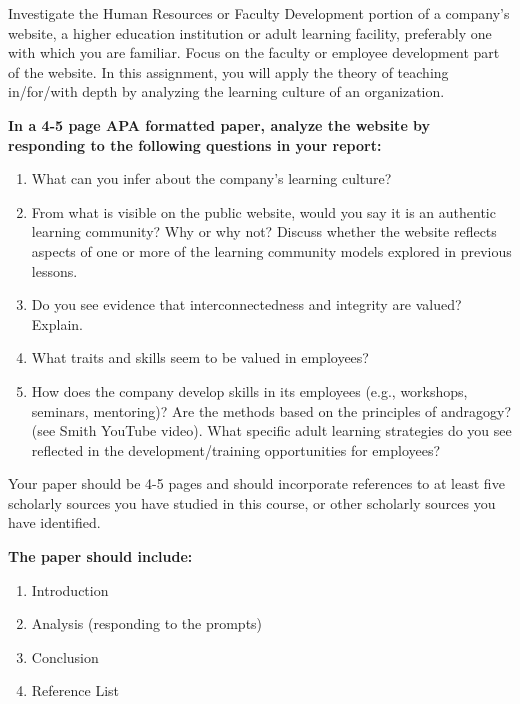 \documentclass[
]{book}
\providecommand{\tightlist}{%
  \setlength{\itemsep}{0pt}\setlength{\parskip}{0pt}}
\begin{document}
\begin{assessment}
Investigate the Human Resources or Faculty Development portion of a
company's website, a higher education institution or adult learning
facility, preferably one with which you are familiar. Focus on the
faculty or employee development part of the website. In this assignment,
you will apply the theory of teaching in/for/with depth by analyzing the
learning culture of an organization.

\textbf{In a 4-5 page APA formatted paper, analyze the website by
responding to the following questions in your report:}

\begin{enumerate}
\def\labelenumi{\arabic{enumi}.}
\tightlist
\item
  What can you infer about the company's learning culture?\\
\item
  From what is visible on the public website, would you say it is an
  authentic learning community? Why or why not? Discuss whether the
  website reflects aspects of one or more of the learning community
  models explored in previous lessons.\\
\item
  Do you see evidence that interconnectedness and integrity are valued?
  Explain.\\
\item
  What traits and skills seem to be valued in employees?\\
\item
  How does the company develop skills in its employees (e.g., workshops,
  seminars, mentoring)? Are the methods based on the principles of
  andragogy? (see Smith YouTube video). What specific adult learning
  strategies do you see reflected in the development/training
  opportunities for employees?
\end{enumerate}

Your paper should be 4-5 pages and should incorporate references to at
least five scholarly sources you have studied in this course, or other
scholarly sources you have identified.

\textbf{The paper should include:}

\begin{enumerate}
\def\labelenumi{\arabic{enumi}.}
\tightlist
\item
  Introduction\\
\item
  Analysis (responding to the prompts)\\
\item
  Conclusion\\
\item
  Reference List
\end{enumerate}
\end{assessment}
\end{document}
